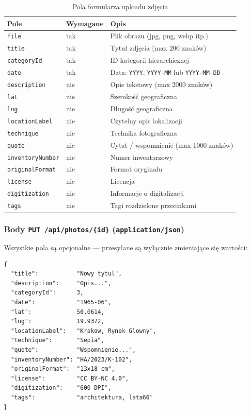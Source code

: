 \documentclass[12pt, a4paper]{article}
\begin{document}
\begin{table}[H]
  \centering
  \caption{Pola formularza uploadu zdjęcia}
  \begin{tabular}{@{}L{3.5cm}L{2cm}L{8.5cm}@{}}
    \toprule
    \textbf{Pole} & \textbf{Wymagane} & \textbf{Opis} \\
    \midrule
    \texttt{file}            & tak & Plik obrazu (jpg, png, webp itp.) \\
    \texttt{title}           & tak & Tytuł zdjęcia (max 200 znaków) \\
    \texttt{categoryId}      & tak & ID kategorii hierarchicznej \\
    \texttt{date}            & tak & Data: \texttt{YYYY}, \texttt{YYYY-MM} lub \texttt{YYYY-MM-DD} \\
    \texttt{description}     & nie & Opis tekstowy (max 2000 znaków) \\
    \texttt{lat}             & nie & Szerokość geograficzna \\
    \texttt{lng}             & nie & Długość geograficzna \\
    \texttt{locationLabel}   & nie & Czytelny opis lokalizacji \\
    \texttt{technique}       & nie & Technika fotograficzna \\
    \texttt{quote}           & nie & Cytat / wspomnienie (max 1000 znaków) \\
    \texttt{inventoryNumber} & nie & Numer inwentarzowy \\
    \texttt{originalFormat}  & nie & Format oryginału \\
    \texttt{license}         & nie & Licencja \\
    \texttt{digitization}    & nie & Informacje o digitalizacji \\
    \texttt{tags}            & nie & Tagi rozdzielone przecinkami \\
    \bottomrule
  \end{tabular}
\end{table}

\subsubsection{Body \texttt{PUT /api/photos/\{id\}} (\texttt{application/json})}

Wszystkie pola są opcjonalne --- przesyłane są wyłącznie zmieniające się wartości:

\begin{lstlisting}[style=plain, caption={Przykładowe ciało żądania PUT /api/photos/\{id\}}]
{
  "title":           "Nowy tytul",
  "description":     "Opis...",
  "categoryId":      3,
  "date":            "1965-06",
  "lat":             50.0614,
  "lng":             19.9372,
  "locationLabel":   "Krakow, Rynek Glowny",
  "technique":       "Sepia",
  "quote":           "Wspomnienie...",
  "inventoryNumber": "HA/2023/K-102",
  "originalFormat":  "13x18 cm",
  "license":         "CC BY-NC 4.0",
  "digitization":    "600 DPI",
  "tags":            "architektura, lata60"
}
\end{lstlisting}
\end{document}
